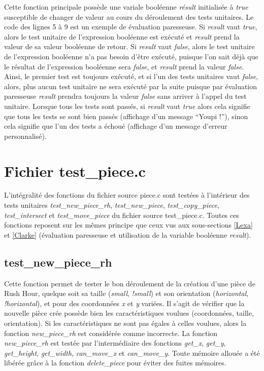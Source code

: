 \documentclass{report}
\begin{document}
Cette fonction principale possède une variale booléenne \emph{résult} initialisée à \emph{true} susceptible de changer de valeur au cours du déroulement des tests unitaires. Le code des lignes 5 à 9 est un exemple de évaluation paresseuse. Si \emph{result} vaut \emph{true}, alors le test unitaire de l'expression booléenne est exécuté et \emph{result} prend la valeur de sa valeur booléenne de retour. Si \emph{result} vaut \emph{false}, alors le test unitaire de l'expression booléenne n'a pas besoin d'être exécuté, puisque l'on sait déjà que le résultat de l'expression booléenne sera \emph{false}, et \emph{result} prend la valeur \emph{false}. Ainsi, le premier test est toujours exécuté, et si l'un des tests unitaires vaut \emph{false}, alors, plus aucun test unitaire ne sera exécuté par la suite puisque par évaluation paresseuse \emph{result} prendra toujours la valeur \emph{false} sans arriver à l'appel du test unitaire. Lorsque tous les tests sont passés, si \emph{result} vaut \emph{true} alors cela signifie que tous les tests se sont bien passés (affichage d'un message ``Youpi !''), sinon cela signifie que l'un des tests a échoué (affichage d'un message d'erreur personnalisé).

\section{Fichier test\_piece.c}
L'intégralité des fonctions du fichier source piece.c sont testées à l'intérieur des tests unitaires \emph{test\_new\_piece\_rh}, \emph{test\_new\_piece}, \emph{test\_copy\_piece}, \emph{test\_intersect} et \emph{test\_move\_piece} du fichier source test\_piece.c. Toutes ces fonctions reposent sur les mêmes principe que ceux vus aux sous-sections \ref{Lexa} et \ref{Clarke} (évaluation paresseuse et utilisation de la variable booléenne \emph{result}).
\subsection{test\_new\_piece\_rh}
Cette fonction permet de tester le bon déroulement de la création d'une pièce de Rush Hour, quelque soit sa taille (\emph{small}, \emph{!small}) et son orientation (\emph{horizontal}, \emph{!horizontal}), et pour des coordonnées \emph{x} et \emph{y} variées. Il s'agit de vérifier que la nouvelle pièce crée possède bien les caractéristiques voulues (coordonnées, taille, orientation). Si les caractéristiques ne sont pas égales à celles voulues, alors la fonction \emph{new\_piece\_rh} est considérée comme incorrecte. La fonction \emph{new\_piece\_rh} est testée par l'intermédiaire des fonctions  \emph{get\_x}, \emph{get\_y}, \emph{get\_height}, \emph{get\_width}, \emph{can\_move\_x} et \emph{can\_move\_y}. Toute mémoire allouée a été libérée grâce à la fonction \emph{delete\_piece} pour éviter des fuites mémoires.
\end{document}
